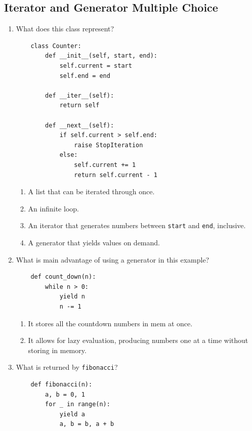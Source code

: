 \documentclass[oneside,11pt,dvipsnames]{book}
\begin{document}
\subsection{Iterator and Generator Multiple Choice}\label{exercise:iterator-generator-mc}


\begin{enumerate}
\item What does this class represent?
\begin{lstlisting}
    class Counter:
        def __init__(self, start, end):
            self.current = start
            self.end = end
    
        def __iter__(self):
            return self
    
        def __next__(self):
            if self.current > self.end:
                raise StopIteration
            else:
                self.current += 1
                return self.current - 1
    \end{lstlisting}
\begin{enumerate}
    \item A list that can be iterated through once.
    \item An infinite loop.
    \item An iterator that generates numbers between \texttt{start} and \texttt{end}, inclusive.
    \item A generator that yields values on demand.
\end{enumerate}




\item What is main advantage of using a generator in this example?
\begin{lstlisting}
    def count_down(n):
        while n > 0:
            yield n
            n -= 1
    \end{lstlisting}

\begin{enumerate}
    \item It stores all the countdown numbers in mem at once.
    \item It allows for lazy evaluation, producing numbers one at a time without storing in memory.
\end{enumerate}


\item What is returned by \texttt{fibonacci}?

\begin{lstlisting}
    def fibonacci(n):
        a, b = 0, 1
        for _ in range(n):
            yield a
            a, b = b, a + b
\end{lstlisting}


\end{enumerate}
\end{document}
